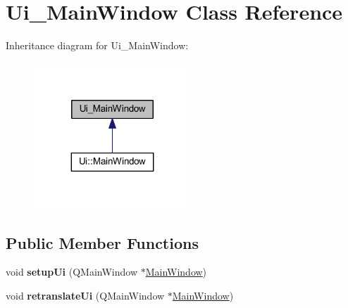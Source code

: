 \hypertarget{class_ui___main_window}{}\section{Ui\+\_\+\+Main\+Window Class Reference}
\label{class_ui___main_window}


Inheritance diagram for Ui\+\_\+\+Main\+Window\+:
\nopagebreak
\begin{figure}[H]
\begin{center}
\leavevmode
\includegraphics[width=167pt]{class_ui___main_window__inherit__graph}
\end{center}
\end{figure}
\subsection*{Public Member Functions}
\begin{DoxyCompactItemize}
\item 
\mbox{\label{class_ui___main_window_acf4a0872c4c77d8f43a2ec66ed849b58}} 
void {\bfseries setup\+Ui} (Q\+Main\+Window $\ast$\mbox{\hyperlink{class_main_window}{Main\+Window}})
\item 
\mbox{\label{class_ui___main_window_a097dd160c3534a204904cb374412c618}} 
void {\bfseries retranslate\+Ui} (Q\+Main\+Window $\ast$\mbox{\hyperlink{class_main_window}{Main\+Window}})
\end{DoxyCompactItemize}
